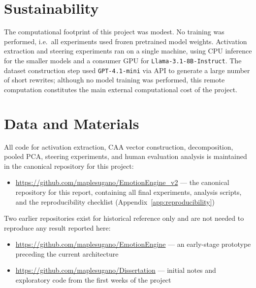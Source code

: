\section*{Sustainability}

The computational footprint of this project was modest. No training was performed, i.e.\ all experiments used frozen pretrained model weights. Activation extraction and steering experiments ran on a single machine, using CPU inference for the smaller models and a consumer GPU for \texttt{Llama-3.1-8B-Instruct}. The dataset construction step used \texttt{GPT-4.1-mini} via API to generate a large number of short rewrites; although no model training was performed, this remote computation constitutes the main external computational cost of the project.

\section*{Data and Materials}

All code for activation extraction, CAA vector construction, decomposition, pooled PCA, steering experiments, and human evaluation analysis is maintained in the canonical repository for this project:

\begin{itemize}
    \item \url{https://github.com/maplesugano/EmotionEngine_v2} --- the canonical repository for this report, containing all final experiments, analysis scripts, and the reproducibility checklist (Appendix~\ref{app:reproducibility})
\end{itemize}

Two earlier repositories exist for historical reference only and are not needed to reproduce any result reported here:
\begin{itemize}
    \item \url{https://github.com/maplesugano/EmotionEngine} --- an early-stage prototype preceding the current architecture
    \item \url{https://github.com/maplesugano/Dissertation} --- initial notes and exploratory code from the first weeks of the project
\end{itemize}